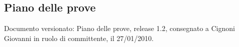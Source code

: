\subsection{Piano delle prove}
Documento versionato: Piano delle prove, release 1.2, consegnato a Cignoni
Giovanni in ruolo di committente, il 27/01/2010.
